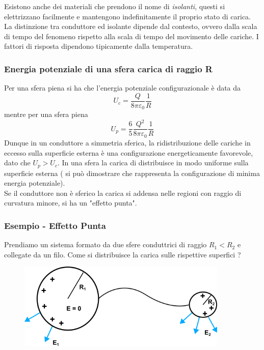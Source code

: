 Esistono anche dei materiali che prendono il nome di \textit{isolanti}, questi si elettrizzano facilmente e mantengono indefinitamente il proprio stato di carica. La distinzione tra conduttore ed isolante dipende dal contesto, ovvero dalla scala di tempo del fenomeno rispetto alla scala di tempo del movimento delle cariche. I fattori di risposta dipendono tipicamente dalla temperatura.

\subsubsection{Energia potenziale di una sfera carica di raggio R}

Per una sfera piena si ha che l'energia potenziale configurazionale \`e data da 
\begin{equation*}
	U_c = \frac{Q}{8 \pi \varepsilon_0} \frac{1}{R}
\end{equation*}
mentre per una sfera piena
\begin{equation*}
	U_p = \frac{6}{5} \frac{Q^2}{8 \pi \varepsilon_0} \frac{1}{R}
	\end{equation*}
Dunque in un conduttore a simmetria sferica, la ridistribuzione delle cariche in eccesso sulla superficie  esterna \`e una configurazione energeticamente favorevole, dato che $U_p > U_c$.
In  una sfera la carica di distribuisce in modo uniforme sulla superficie esterna  ( si pu\`o dimostrare che rappresenta la configurazione di minima energia potenziale).
\\
Se il conduttore non \`e sferico la carica si addensa nelle regioni con raggio di curvatura minore, si ha un "effetto punta".
\newpage
\subsubsection{Esempio - Effetto Punta}

Prendiamo un sistema formato da due sfere conduttrici di raggio $R_1 < R_2$ e collegate da un filo. Come si distribuisce la carica sulle rispettive superfici ?
\begin{figure}[!ht]
\vspace{0.2in}
\includegraphics[width = 10cm]{images/punta}	
\centering
\vspace{0.2in}
\end{figure} 

